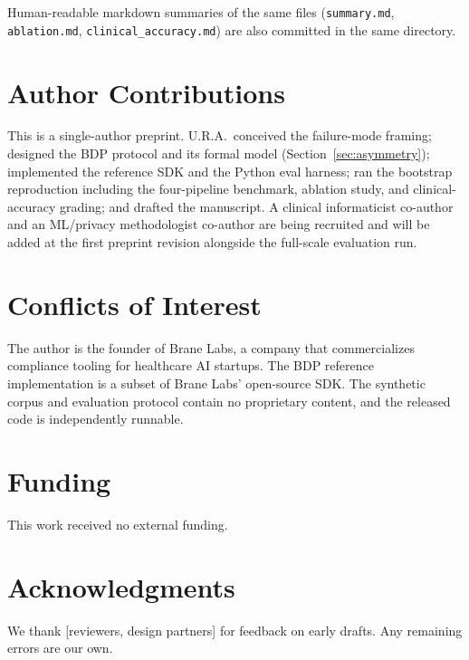 \documentclass[11pt,a4paper]{article}
\begin{document}
Human-readable markdown summaries of the same files
(\texttt{summary.md}, \texttt{ablation.md},
\texttt{clinical\_accuracy.md}) are also committed in the same directory.

\section*{Author Contributions}

This is a single-author preprint. U.R.A.\ conceived the failure-mode
framing; designed the BDP protocol and its formal model
(Section~\ref{sec:asymmetry}); implemented the reference SDK and the
Python eval harness; ran the bootstrap reproduction including the
four-pipeline benchmark, ablation study, and clinical-accuracy grading;
and drafted the manuscript. A clinical informaticist co-author and an
ML/privacy methodologist co-author are being recruited and will be added
at the first preprint revision alongside the full-scale evaluation run.

\section*{Conflicts of Interest}

The author is the founder of Brane Labs, a company that commercializes
compliance tooling for healthcare AI startups. The BDP reference
implementation is a subset of Brane Labs' open-source SDK. The synthetic
corpus and evaluation protocol contain no proprietary content, and the
released code is independently runnable.

\section*{Funding}

This work received no external funding.

\section*{Acknowledgments}

We thank [reviewers, design partners] for feedback on early drafts. Any
remaining errors are our own.



\end{document}
